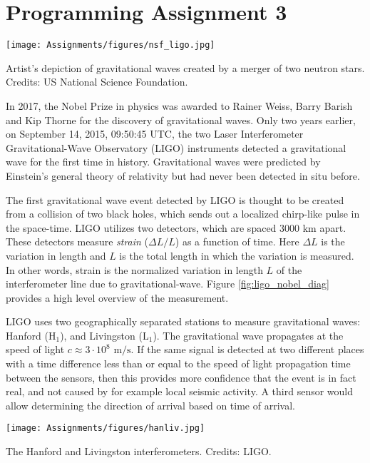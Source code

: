 \chapter{Programming Assignment 3}

\begin{marginfigure}
  \begin{center}
    \texttt{[image: Assignments/figures/nsf\_ligo.jpg]}
  \end{center}
  \caption{Artist's depiction of gravitational waves created by a merger of two neutron stars. Credits: US National Science Foundation.}
\end{marginfigure}

In 2017, the Nobel Prize in physics was awarded to Rainer Weiss, Barry
Barish and Kip Thorne for the discovery of gravitational waves. Only
two years earlier, on September 14, 2015, 09:50:45 UTC, the two Laser
Interferometer Gravitational-Wave Observatory (LIGO) instruments
detected a gravitational wave for the first time in
history. Gravitational waves were predicted by Einstein’s general
theory of relativity but had never been detected in situ before.

The first gravitational wave event detected by LIGO is thought to be
created from a collision of two black holes, which sends out a
localized chirp-like pulse in the space-time. LIGO utilizes two
detectors, which are spaced 3000 km apart. These detectors measure
\emph{strain} ($\Delta L/L$) as a function of time. Here $\Delta L$ is
the variation in length and $L$ is the total length in which the
variation is measured. In other words, strain is the normalized
variation in length $L$ of the interferometer line due to
gravitational-wave. Figure \ref{fig:ligo_nobel_diag} provides a high
level overview of the measurement.

LIGO uses two geographically separated stations to measure gravitational
waves: Hanford (H$_1$), and Livingston (L$_1$). The gravitational wave
propagates at the speed of light $c\approx 3\cdot 10^8$
$\mathrm{m}/\mathrm{s}$. If the same signal is detected at two
different places with a time difference less than or equal to the
speed of light propagation time between the sensors, then this
provides more confidence that the event is in fact real, and not
caused by for example local seismic activity. A third sensor would
allow determining the direction of arrival based on time of arrival.

\begin{marginfigure}
  \begin{center}
    \texttt{[image: Assignments/figures/hanliv.jpg]}
  \end{center}
  \caption{The Hanford and Livingston interferometers. Credits: LIGO.}
\end{marginfigure}

